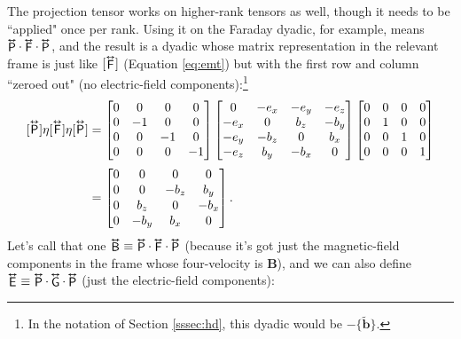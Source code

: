 \documentclass[12pt]{article}
\renewcommand{\vv}[1]{\mathbf{#1}}
\newcommand{\tightoverset}[2]{%
  \mathop{#2}\limits^{\vbox to -.5ex{\kern-0.75ex\hbox{$#1$}\vss}}}
\newcommand{\inlinedy}[1]{\tightoverset{\text{\tiny$\bm\leftrightarrow$}}{#1}}
\newcommand{\capdy}[1]{ \overset{ \text{\tiny$\bm\leftrightarrow$} }{\vphantom{\text{\small{A}}}\smash{#1}} }
\begin{document}
The projection tensor works on higher-rank tensors as well, though it needs to be ``applied" once per rank. Using it on the Faraday dyadic, for example, means $\inlinedy{\mathsf{P}} \cdot \inlinedy{\mathsf{F}} \cdot \inlinedy{\mathsf{P}}$, and the result is a dyadic whose matrix representation in the relevant frame is just like $[\inlinedy{\mathsf{F}}]$ (Equation \ref{eq:emt}) but with the first row and column ``zeroed out" (no electric-field components):\footnote{In the notation of Section \ref{sssec:hd}, this dyadic would be $- \{ \tilde{\vv b} \}$.}
\begin{equation*}
\begin{aligned}
[\capdy{\mathsf{P}}] \eta [\capdy{\mathsf{F}}] \eta [\capdy{\mathsf{P}}]
&=
\begin{bmatrix}
0 & 0 & 0 & 0 \\
0 & -1 & 0 & 0 \\
0 & 0 & -1 & 0 \\
0 & 0 & 0 & -1
\end{bmatrix}
\begin{bmatrix}
0 & -e_x & -e_y & -e_z \\
-e_x & 0 & b_z & -b_y \\
-e_y & -b_z & 0 & b_x \\
-e_z & b_y & -b_x & 0
\end{bmatrix}
\begin{bmatrix}
0 & 0 & 0 & 0 \\
0 & 1 & 0 & 0 \\
0 & 0 & 1 & 0 \\
0 & 0 & 0 & 1
\end{bmatrix}
\\[.5ex]
&=
\begin{bmatrix}
0 & 0 & 0 & 0 \\[.125ex]
0 & 0 & -b_z & b_y \\[.125ex]
0 & b_z & 0 & -b_x \\[.125ex]
0 & -b_y & b_x & 0
\end{bmatrix} .
\end{aligned}
\end{equation*}
Let's call that one $\inlinedy{\mathsf{B}} \equiv \inlinedy{\mathsf{P}} \cdot \inlinedy{\mathsf{F}} \cdot \inlinedy{\mathsf{P}}$ (because it's got just the magnetic-field components in the frame whose four-velocity is $\vv B$), and we can also define $\inlinedy{\mathsf{E}} \equiv \inlinedy{\mathsf{P}} \cdot \inlinedy{\mathsf{G}} \cdot \inlinedy{\mathsf{P}}$ (just the electric-field components):
\end{document}
